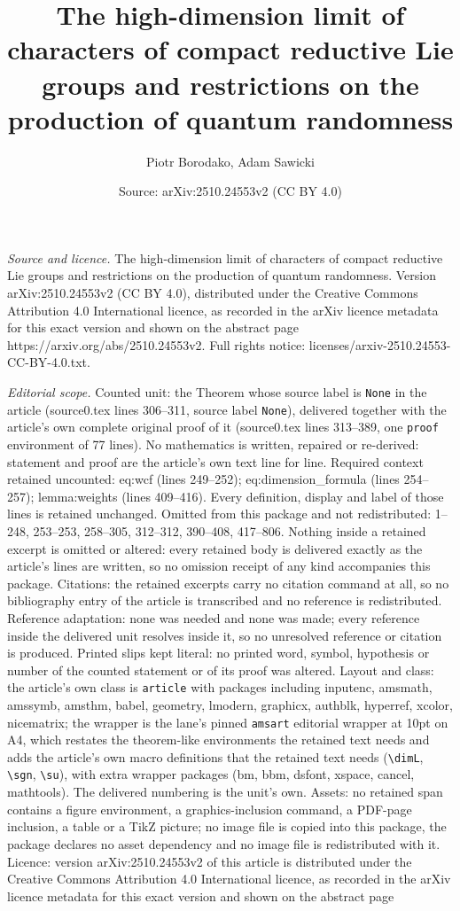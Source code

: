 \documentclass[10pt,a4paper]{amsart}
\title[The high-dimension limit of characters of compact reductive ]{The high-dimension limit of characters of compact reductive Lie groups and restrictions on the production of quantum randomness}
\author{Piotr Borodako, Adam Sawicki}
\date{Source: arXiv:2510.24553v2 (CC BY 4.0)}
\begin{document}
\maketitle

\noindent\emph{Source and licence.} The high-dimension limit of characters of compact reductive Lie groups and restrictions on the production of quantum randomness. Version arXiv:2510.24553v2 (CC BY 4.0), distributed under the Creative Commons Attribution 4.0 International licence, as recorded in the arXiv licence metadata for this exact version and shown on the abstract page https://arxiv.org/abs/2510.24553v2. Full rights notice: licenses/arxiv-2510.24553-CC-BY-4.0.txt.\par\smallskip

\noindent\textit{Editorial scope.} Counted unit: the Theorem whose source label is \texttt{None} in the article (source0.tex lines 306--311, source label \texttt{None}), delivered together with the article's own complete original proof of it (source0.tex lines 313--389, one \texttt{proof} environment of 77 lines). No mathematics is written, repaired or re-derived: statement and proof are the article's own text line for line. Required context retained uncounted: eq:wcf (lines 249--252); eq:dimension\_formula (lines 254--257); lemma:weights (lines 409--416). Every definition, display and label of those lines is retained unchanged. Omitted from this package and not redistributed: 1--248, 253--253, 258--305, 312--312, 390--408, 417--806. Nothing inside a retained excerpt is omitted or altered: every retained body is delivered exactly as the article's lines are written, so no omission receipt of any kind accompanies this package. Citations: the retained excerpts carry no citation command at all, so no bibliography entry of the article is transcribed and no reference is redistributed. Reference adaptation: none was needed and none was made; every reference inside the delivered unit resolves inside it, so no unresolved reference or citation is produced. Printed slips kept literal: no printed word, symbol, hypothesis or number of the counted statement or of its proof was altered. Layout and class: the article's own class is \texttt{article} with packages including inputenc, amsmath, amssymb, amsthm, babel, geometry, lmodern, graphicx, authblk, hyperref, xcolor, nicematrix; the wrapper is the lane's pinned \texttt{amsart} editorial wrapper at 10pt on A4, which restates the theorem-like environments the retained text needs and adds the article's own macro definitions that the retained text needs (\texttt{\textbackslash dimL}, \texttt{\textbackslash sgn}, \texttt{\textbackslash su}), with extra wrapper packages (bm, bbm, dsfont, xspace, cancel, mathtools). The delivered numbering is the unit's own. Assets: no retained span contains a figure environment, a graphics-inclusion command, a PDF-page inclusion, a table or a TikZ picture; no image file is copied into this package, the package declares no asset dependency and no image file is redistributed with it. Licence: version arXiv:2510.24553v2 of this article is distributed under the Creative Commons Attribution 4.0 International licence, as recorded in the arXiv licence metadata for this exact version and shown on the abstract page 
\end{document}
